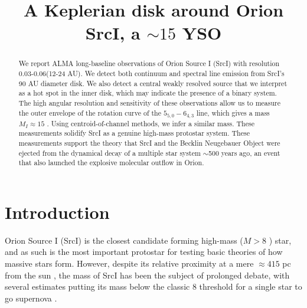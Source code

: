\documentclass[twocolumn]{aastex61}
\newcommand{\sourcei}{SrcI\xspace}
\begin{document}


\title{A Keplerian disk around Orion \sourcei, a $\sim15$ \msun YSO}
\begin{abstract}
   We report ALMA long-baseline observations of Orion Source I (\sourcei) with resolution
   0.03-0.06\arcsec (12-24 AU).
   We detect both continuum and spectral line emission from \sourcei's 90 AU diameter disk.
   We also detect a central weakly resolved source that we interpret as a hot spot
   in the inner disk, which may indicate the presence of a binary system.
   The high angular resolution and sensitivity of these observations allow us
   to measure the outer envelope of the rotation curve of the \water
   $5_{5,0}-6_{4,3}$ line, which gives a mass $M_I\approx15$ \msun.  Using
   centroid-of-channel methods,
   we infer a similar mass.
   These measurements solidify \sourcei as a genuine
   high-mass protostar system.
   These measurements support the theory that \sourcei and the Becklin
   Neugebauer Object were ejected from the dynamical decay of a multiple star
   system $\sim$500 years ago, an event that also launched the explosive
   molecular outflow in Orion.
\end{abstract}

\section{Introduction}
Orion Source I (\sourcei) is the closest candidate forming high-mass ($M>8$ \msun) star, 
and as such is the most important protostar for testing basic theories
of how massive stars form.  However, despite its relative proximity at
a mere $\approx415$ pc from the sun \citep{Menten2007a,Kim2008a}, the mass of \sourcei
has been the subject of prolonged debate, with several estimates
putting
its mass below the classic 8 \msun threshold for a single star to go supernova
\citep[][]{Heger2003}.
\end{document}
